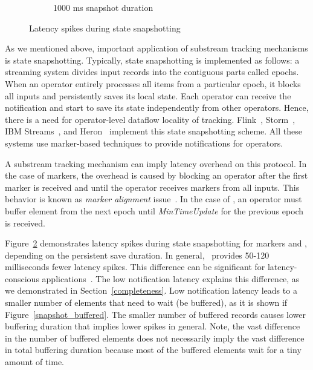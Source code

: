 \begin{figure}[t!]
\begin{subfigure}[b]{0.32\textwidth}
            \caption{1000 ms snapshot duration}
            \label{1000ms_snapshot}
    \end{subfigure}
    \caption{Latency spikes during state snapshotting}
    \label{snapshot_spikes}
\end{figure}

As we mentioned above, important application of substream tracking mechanisms is state snapshotting. Typically, state snapshotting is implemented as follows: a streaming system divides input records into the contiguous parts called epochs. When an operator entirely processes all items from a particular epoch, it blocks all inputs and persistently saves its local state. Each operator can receive the notification and start to save its state independently from other operators. Hence, there is a need for operator-level dataflow locality of tracking. Flink~\cite{Carbone:2017:SMA:3137765.3137777}, Storm~\cite{apache:storm:state}, IBM Streams~\cite{jacques2016consistent}, and Heron~\cite{Kulkarni:2015:THS:2723372.2742788} implement this state snapshotting scheme. All these systems use marker-based techniques to provide notifications for operators.

A substream tracking mechanism can imply latency overhead on this protocol. In the case of markers, the overhead is caused by blocking an operator after the first marker is received and until the operator receives markers from all inputs. This behavior is known as {\em marker alignment} issue~\cite{Carbone:2017:SMA:3137765.3137777}. In the case of \tracker , an operator must buffer element from the next epoch until {\em MinTimeUpdate} for the previous epoch is received.

Figure~\ref{snapshot_spikes} demonstrates latency spikes during state snapshotting for markers and \tracker, depending on the persistent save duration. In general, \tracker\ provides 50-120 milliseconds fewer latency spikes. This difference can be significant for latency-conscious applications~\cite{zhang2017sub}. The low notification latency explains this difference, as we demonstrated in Section~\ref{completeness}. Low notification latency leads to a smaller number of elements that need to wait (be buffered), as it is shown if Figure~\ref{snapshot_buffered}. The smaller number of buffered records causes lower buffering duration that implies lower spikes in general. Note, the vast difference in the number of buffered elements does not necessarily imply the vast difference in total buffering duration because most of the buffered elements wait for a tiny amount of time.


